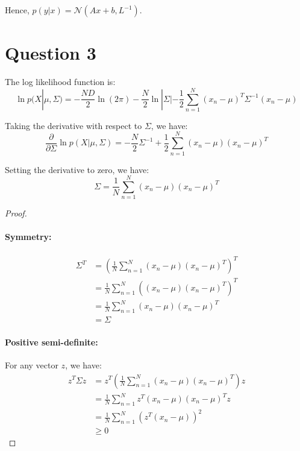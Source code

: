 \documentclass[a4paper,12pt]{article}
\newcommand{\pard}[2]{\frac{\partial #1}{\partial #2}}
\begin{document}
Hence, $p(y|x) = \mathcal{N}(Ax + b, L^{-1})$.

\section*{Question 3}

The log likelihood function is:
\begin{equation*}
	\ln p(X|\mu, \Sigma) = -\frac{ND}{2}\ln(2\pi) - \frac{N}{2}\ln|\Sigma| - \frac{1}{2}\sum_{n=1}^{N}(x_n - \mu)^T\Sigma^{-1}(x_n - \mu)
\end{equation*}

Taking the derivative with respect to $\Sigma$, we have:
\begin{equation*}
	\pard{}{\Sigma}\ln p(X|\mu, \Sigma) = -\frac{N}{2}\Sigma^{-1} + \frac{1}{2}\sum_{n=1}^{N}(x_n - \mu)(x_n - \mu)^T
\end{equation*}

Setting the derivative to zero, we have:
\begin{equation*}
	\Sigma = \frac{1}{N}\sum_{n=1}^{N}(x_n - \mu)(x_n - \mu)^T
\end{equation*}

\begin{proof}
$ $
\paragraph{Symmetry:} 
\begin{align*}
	\Sigma^T &= \left(\frac{1}{N}\sum_{n=1}^{N}(x_n - \mu)(x_n - \mu)^T\right)^T \\
	&= \frac{1}{N}\sum_{n=1}^{N} \left((x_n - \mu)(x_n - \mu)^T\right)^T \\
	&= \frac{1}{N}\sum_{n=1}^{N} (x_n - \mu)(x_n - \mu)^T \\
	&= \Sigma
\end{align*}

\paragraph{Positive semi-definite:}
For any vector $z$, we have:
\begin{align*}
	z^T\Sigma z &= z^T\left(\frac{1}{N}\sum_{n=1}^{N}(x_n - \mu)(x_n - \mu)^T\right)z \\
	&= \frac{1}{N}\sum_{n=1}^{N}z^T(x_n - \mu)(x_n - \mu)^Tz \\
	&= \frac{1}{N}\sum_{n=1}^{N}(z^T(x_n - \mu))^2 \\
	&\geq 0
\end{align*}
\end{proof}
\end{document}
